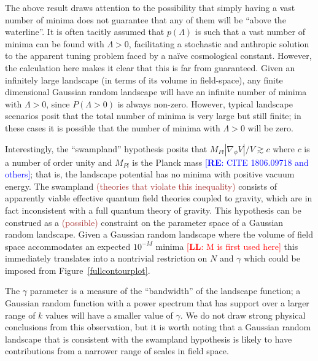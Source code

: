 \documentclass[12pt]{article}
\newcommand{\re}[1]{\textcolor{blue}{[{\bf RE}: #1]}}
\newcommand{\lfl}[1]{\textcolor{red}{[{\bf LL}: #1]}}
\newcommand{\sh}[1]{\textcolor{brown}{#1}}
\begin{document}
The above result draws attention to the possibility that simply having a vast number of minima does not guarantee that any of them will be ``above the waterline''.  It is often tacitly assumed that $p(\Lambda)$ is such that a vast number of minima can be found with $\Lambda>0$, facilitating a stochastic and anthropic solution to the apparent tuning problem faced by a na\"ive cosmological constant. However, the calculation here makes it clear that this is far from guaranteed. Given an infinitely large landscape (in terms of its volume in field-space), any finite dimensional Gaussian random landscape will have an infinite number of minima with $\Lambda>0$, since $P(\Lambda >0)$ is always non-zero. However, typical landscape scenarios posit that the total number of minima is very large but still finite; in these cases it is possible that the number of minima with $\Lambda >0$ will be zero.  

Interestingly, the ``swampland'' hypothesis posits that $M_{Pl} |\nabla_\phi V|/ V \gtrsim c$ where $c$ is a number of order unity and $M_{Pl}$ is the Planck mass \cite{Agrawal2018}\re{CITE  1806.09718 and others}; that is, the landscape potential has no minima with  positive vacuum energy. The swampland \sh{(theories that violate this inequality)} consists of apparently viable effective quantum field theories coupled to gravity, which are in fact inconsistent with a full quantum theory of gravity. This hypothesis can be construed as a \sh{(possible)} constraint on the parameter space of a Gaussian random landscape. Given a Gaussian random landscape where the volume of field space accommodates an expected $10^{-M}$ minima \lfl{M is first used here} this immediately translates into a nontrivial restriction on $N$ and $\gamma$ which could be imposed from  Figure~\ref{fullcontourplot}. 

The $\gamma$  parameter is a measure of the ``bandwidth'' of the landscape function; a Gaussian random function with a power spectrum that has support over a larger range of $k$ values will have a smaller value of $\gamma$. We do not draw strong physical conclusions from this observation, but it is worth noting that a Gaussian random landscape that is consistent with the swampland hypothesis is likely to have contributions from a narrower range of scales in field space. 
\end{document}
